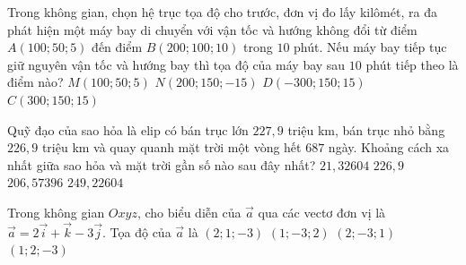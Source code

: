 \begin{ex} %
	Trong không gian, chọn hệ trục tọa độ cho trước, đơn vị đo lấy kilômét, ra đa phát hiện một máy bay di chuyển với vận tốc và hướng không đổi từ điểm $A(100;50;5)$ đến điểm $B(200;100;10)$ trong $10$ phút. Nếu máy bay tiếp tục giữ nguyên vận tốc và hướng bay thì tọa độ của máy bay sau $10$ phút tiếp theo là điểm nào?
	\choice
	{$M(100;50;5)$}
	{$N(200;150;-15)$}
	{$D(-300;150;15)$}
	{\True $C(300;150;15)$}
\end{ex}

\begin{ex} %
	Quỹ đạo của sao hỏa là elip có bán trục lớn $227{,}9$ triệu km, bán trục nhỏ bằng $226{,}9$ triệu km và quay quanh mặt trời một vòng hết $687$ ngày. Khoảng cách xa nhất giữa sao hỏa và mặt trời gần số nào sau đây nhất?
	\choice
	{$21{,}32604$}
	{$226{,}9$}
	{$206{,}57396$}
	{\True $249{,}22604$}
\end{ex}

\begin{ex} %
	Trong không gian $Oxyz$, cho biểu diễn của $\overrightarrow{a}$ qua các vectơ đơn vị là $\overrightarrow{a}=2\overrightarrow{i}+\overrightarrow{k}-3\overrightarrow{j}$. Tọa độ của $\overrightarrow{a}$ là
	\choice
	{$(2;1;-3)$}
	{$(1;-3;2)$}
	{\True $(2;-3;1)$}
	{$(1;2;-3)$}
\end{ex}

